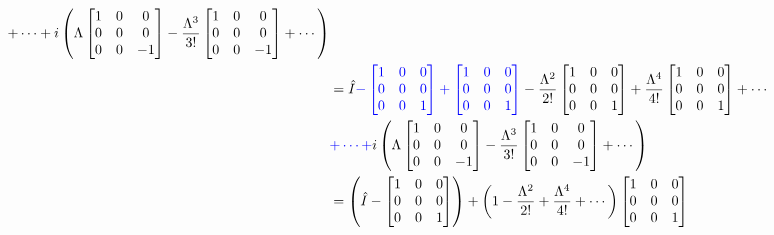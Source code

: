 \documentclass[letter, 10pts]{article}
\begin{document}
\begin{align*}
	+ 
	\cdots 
	+
	i 
	\left(
\Lambda 
	\begin{bmatrix} 1&0&0\\0&0&0\\0&0&-1 \end{bmatrix} 
	-
	\frac{\Lambda^3}{3!}
	\begin{bmatrix} 1&0&0\\0&0&0\\0&0&-1 \end{bmatrix} 
+ \cdots
		\right) 
\\ 
			 &= 
			\hat{I} 
			\textcolor{blue}{		-
	\begin{bmatrix} 1&0&0\\0&0&0\\0&0&1 \end{bmatrix}  
+
\begin{bmatrix} 1&0&0\\0&0&0\\0&0&1 \end{bmatrix}   } 
	-
	\frac{\Lambda^2}{2!}
	\begin{bmatrix} 1&0&0\\0&0&0\\0&0&1 \end{bmatrix}  
+ \frac{\Lambda^{4}}{4!}
	\begin{bmatrix} 1&0&0\\0&0&0\\0&0&1 \end{bmatrix}  
	+ 
	\cdots 
		      \\ & 	\textcolor{blue}{+ \cdots +}  
	i 
	\left(
\Lambda 
	\begin{bmatrix} 1&0&0\\0&0&0\\0&0&-1 \end{bmatrix} 
	-
	\frac{\Lambda^3}{3!}
	\begin{bmatrix} 1&0&0\\0&0&0\\0&0&-1 \end{bmatrix} 
+ \cdots
		\right) \\
			 &= 
			\left(\hat{I} 
			-
	\begin{bmatrix} 1&0&0\\0&0&0\\0&0&1 \end{bmatrix}  \right)
+
\left(	1 -
	\frac{\Lambda^2}{2!}
+ \frac{\Lambda^{4}}{4!}
	+ 
	\cdots \right)
	\begin{bmatrix} 1&0&0\\0&0&0\\0&0&1 \end{bmatrix}   

\end{align*}
\end{document}
